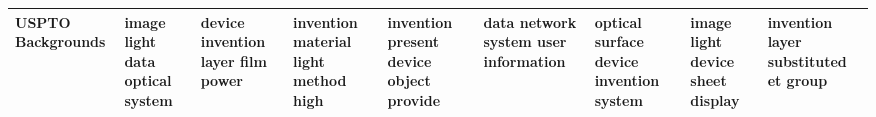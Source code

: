 \documentclass[11pt,a4paper]{article}
\begin{document}
\begin{appendices}
\begin{table*}[htb]
\begin{tiny}
\begin{tabular}{|p{}|p{}|p{}|p{}|p{}|p{}|p{}|p{}|p{}|}
    USPTO Backgrounds & image \newline light \newline data \newline optical \newline system & device \newline invention \newline layer \newline film \newline power & invention \newline material \newline light \newline method \newline high & invention \newline present \newline device \newline object \newline provide & data \newline network \newline system \newline user \newline information & optical \newline surface \newline device \newline invention \newline system & image \newline light \newline device \newline sheet \newline display & invention \newline layer \newline substituted \newline et \newline group\\\hline

\end{tabular}
\end{tiny}
\end{table*}
\end{appendices}
\end{document}
